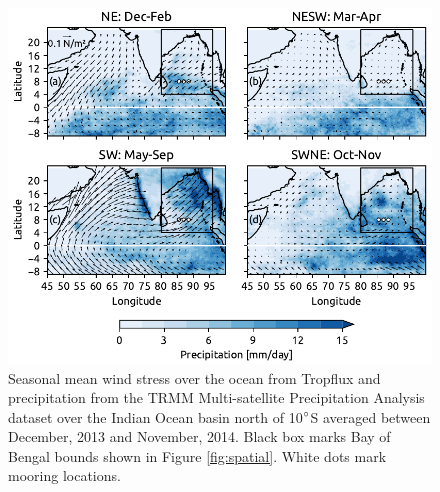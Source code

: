 \documentclass[twocol]{ametsoc}
\begin{document}
\begin{table}
\label{tab:medians}
\footnotesize
\centering
{}

\end{table}

\begin{figure}
\centering
\includegraphics[width=33pc]{figure1-ppt.pdf}
\caption{\label{fig:ppt}
Seasonal mean wind stress over the ocean from Tropflux \citep{Kumar2012} and precipitation from the TRMM Multi-satellite Precipitation Analysis dataset \citep{trmm} over the Indian Ocean basin north of 10\(\degree\)S averaged between December, 2013 and November, 2014. Black box marks Bay of Bengal bounds shown in Figure \ref{fig:spatial}. White dots mark mooring locations.}
\end{figure}
\end{document}
